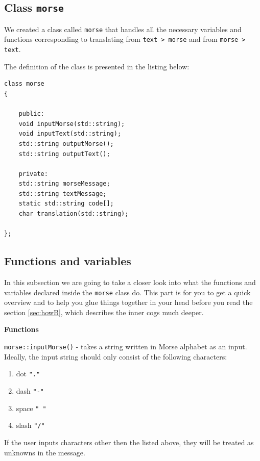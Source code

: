 \documentclass[10pt]{report}
\begin{document}
\subsection{Class \texttt{morse}}

We created a class called \verb|morse| that handles all the necessary variables and functions corresponding to translating from \verb|text > morse| and from \verb|morse > text|.

The definition of the class is presented in the listing below:

\begin{lstlisting}
class morse
{

	public:
	void inputMorse(std::string);
	void inputText(std::string);
	std::string outputMorse();
	std::string outputText();

	private:
	std::string morseMessage;
	std::string textMessage;
	static std::string code[];
	char translation(std::string);

};
\end{lstlisting}

\subsection{Functions and variables}

In this subsection we are going to take a closer look into what the functions and variables declared inside the \verb|morse| class do. This part is for you to get a quick overview and to help you glue things together in your head before you read the section \ref{sec:howB}, which describes the inner cogs much deeper.

\textbf{Functions}

\verb|morse::inputMorse()| - takes a string written in Morse alphabet as an input. Ideally, the input string should only consist of the following characters:

\begin{enumerate}
\item dot \verb|"."|

\item dash \verb|"-"|

\item space \verb|" "|

\item slash \verb|"/"|
\end{enumerate}

If the user inputs characters other then the listed above, they will be treated as unknowns in the message.
\end{document}

